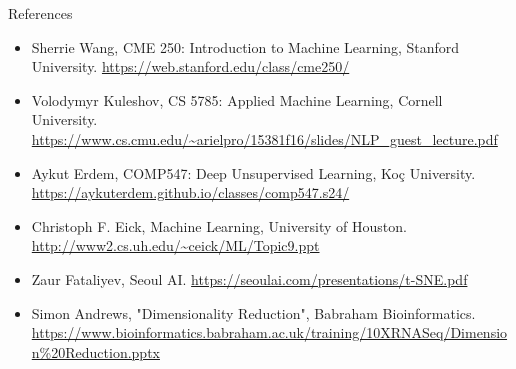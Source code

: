 \begin{frame}[allowframebreaks]{References}
    \begin{itemize}
        \item Sherrie Wang, CME 250: Introduction to Machine Learning, Stanford University. \url{https://web.stanford.edu/class/cme250/}
        \item Volodymyr Kuleshov, CS 5785: Applied Machine Learning, Cornell University. \url{https://www.cs.cmu.edu/~arielpro/15381f16/slides/NLP_guest_lecture.pdf}
        \item Aykut Erdem, COMP547: Deep Unsupervised Learning, Koç University. \url{https://aykuterdem.github.io/classes/comp547.s24/}
        \item Christoph F. Eick, Machine Learning, University of Houston. \url{http://www2.cs.uh.edu/~ceick/ML/Topic9.ppt}
        \item Zaur Fataliyev, Seoul AI. \url{https://seoulai.com/presentations/t-SNE.pdf}
        \item Simon Andrews, "Dimensionality Reduction", Babraham Bioinformatics. \url{https://www.bioinformatics.babraham.ac.uk/training/10XRNASeq/Dimension\%20Reduction.pptx}
        
    \end{itemize}
\end{frame}